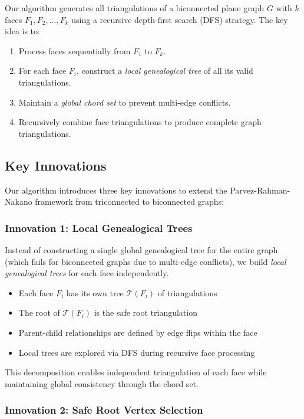 \documentclass[12pt,a4paper]{article}
\theoremstyle{definition}
\theoremstyle{remark}
\begin{document}
Our algorithm generates all triangulations of a biconnected plane graph $G$ with $k$ faces $F_1, F_2, \ldots, F_k$ using a recursive depth-first search (DFS) strategy. The key idea is to:

\begin{enumerate}
    \item Process faces sequentially from $F_1$ to $F_k$.
    \item For each face $F_i$, construct a \emph{local genealogical tree} of all its valid triangulations.
    \item Maintain a \emph{global chord set} to prevent multi-edge conflicts.
    \item Recursively combine face triangulations to produce complete graph triangulations.
\end{enumerate}

\subsection{Key Innovations}

Our algorithm introduces three key innovations to extend the Parvez-Rahman-Nakano framework from triconnected to biconnected graphs:

\subsubsection{Innovation 1: Local Genealogical Trees}

Instead of constructing a single global genealogical tree for the entire graph (which fails for biconnected graphs due to multi-edge conflicts), we build \emph{local genealogical trees} for each face independently.

\begin{itemize}
    \item Each face $F_i$ has its own tree $\mathcal{T}(F_i)$ of triangulations
    \item The root of $\mathcal{T}(F_i)$ is the safe root triangulation
    \item Parent-child relationships are defined by edge flips within the face
    \item Local trees are explored via DFS during recursive face processing
\end{itemize}

This decomposition enables independent triangulation of each face while maintaining global consistency through the chord set.

\subsubsection{Innovation 2: Safe Root Vertex Selection}
\end{document}
